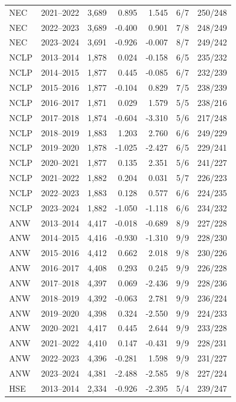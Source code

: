 \begin{longtable}{@{}llrrrrr@{}}
NEC & 2021--2022 & 3,689 & 0.895 & 1.545 & 6/7 & 250/248 \\
NEC & 2022--2023 & 3,689 & -0.400 & 0.901 & 7/8 & 248/249 \\
NEC & 2023--2024 & 3,691 & -0.926 & -0.007 & 8/7 & 249/242 \\
NCLP & 2013--2014 & 1,878 & 0.024 & -0.158 & 6/5 & 235/232 \\
NCLP & 2014--2015 & 1,877 & 0.445 & -0.085 & 6/7 & 232/239 \\
NCLP & 2015--2016 & 1,877 & -0.104 & 0.829 & 7/5 & 238/239 \\
NCLP & 2016--2017 & 1,871 & 0.029 & 1.579 & 5/5 & 238/216 \\
NCLP & 2017--2018 & 1,874 & -0.604 & -3.310 & 5/6 & 217/248 \\
NCLP & 2018--2019 & 1,883 & 1.203 & 2.760 & 6/6 & 249/229 \\
NCLP & 2019--2020 & 1,878 & -1.025 & -2.427 & 6/5 & 229/241 \\
NCLP & 2020--2021 & 1,877 & 0.135 & 2.351 & 5/6 & 241/227 \\
NCLP & 2021--2022 & 1,882 & 0.204 & 0.031 & 5/7 & 226/223 \\
NCLP & 2022--2023 & 1,883 & 0.128 & 0.577 & 6/6 & 224/235 \\
NCLP & 2023--2024 & 1,882 & -1.050 & -1.118 & 6/6 & 234/232 \\
ANW & 2013--2014 & 4,417 & -0.018 & -0.689 & 8/9 & 227/228 \\
ANW & 2014--2015 & 4,416 & -0.930 & -1.310 & 9/9 & 228/230 \\
ANW & 2015--2016 & 4,412 & 0.662 & 2.018 & 9/8 & 230/226 \\
ANW & 2016--2017 & 4,408 & 0.293 & 0.245 & 9/9 & 226/228 \\
ANW & 2017--2018 & 4,397 & 0.069 & -2.436 & 9/9 & 228/236 \\
ANW & 2018--2019 & 4,392 & -0.063 & 2.781 & 9/9 & 236/224 \\
ANW & 2019--2020 & 4,398 & 0.324 & -2.550 & 9/9 & 224/233 \\
ANW & 2020--2021 & 4,417 & 0.445 & 2.644 & 9/9 & 233/228 \\
ANW & 2021--2022 & 4,410 & 0.147 & -0.431 & 9/9 & 228/231 \\
ANW & 2022--2023 & 4,396 & -0.281 & 1.598 & 9/9 & 231/227 \\
ANW & 2023--2024 & 4,381 & -2.488 & -2.585 & 9/8 & 227/224 \\
HSE & 2013--2014 & 2,334 & -0.926 & -2.395 & 5/4 & 239/247 \\

\end{longtable}

